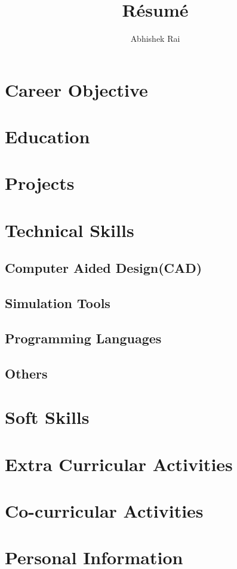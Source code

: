 \documentclass{article}
\begin{document}
	\title{R\'esum\'e}
	\author{Abhishek Rai}
	\maketitle
	\section{Career Objective}
	\section{Education}
	\section{Projects}
	\section{Technical Skills}
	\subsection{Computer Aided Design(CAD)}
	\subsection{Simulation Tools}
	\subsection{Programming Languages}
	\subsection{Others}
	
	\section{Soft Skills}
	\section{Extra Curricular Activities}
	\section{Co-curricular Activities}
	\section{Personal Information}
	
\end{document}

